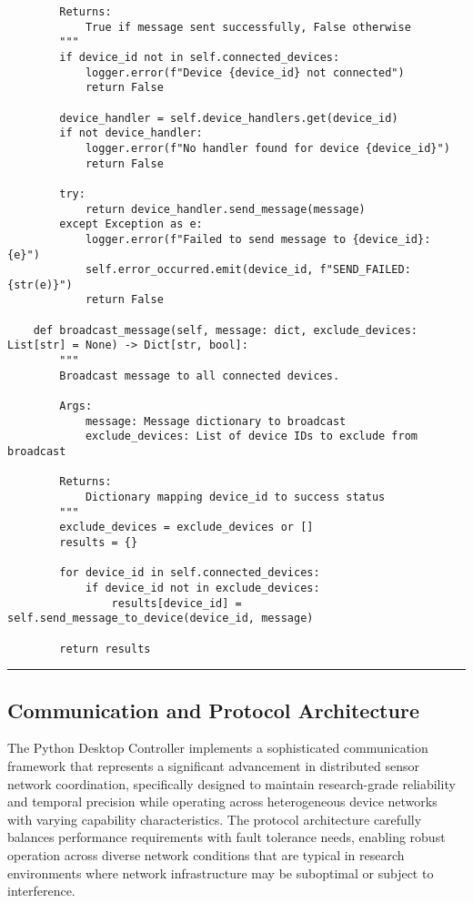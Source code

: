 \documentclass[12pt,a4paper]{article}
\begin{document}
\begin{verbatim}
        Returns:
            True if message sent successfully, False otherwise
        """
        if device_id not in self.connected_devices:
            logger.error(f"Device {device_id} not connected")
            return False

        device_handler = self.device_handlers.get(device_id)
        if not device_handler:
            logger.error(f"No handler found for device {device_id}")
            return False

        try:
            return device_handler.send_message(message)
        except Exception as e:
            logger.error(f"Failed to send message to {device_id}: {e}")
            self.error_occurred.emit(device_id, f"SEND_FAILED: {str(e)}")
            return False

    def broadcast_message(self, message: dict, exclude_devices: List[str] = None) -> Dict[str, bool]:
        """
        Broadcast message to all connected devices.
        
        Args:
            message: Message dictionary to broadcast
            exclude_devices: List of device IDs to exclude from broadcast
            
        Returns:
            Dictionary mapping device_id to success status
        """
        exclude_devices = exclude_devices or []
        results = {}

        for device_id in self.connected_devices:
            if device_id not in exclude_devices:
                results[device_id] = self.send_message_to_device(device_id, message)

        return results
\end{verbatim}

\hrule

\subsection{Communication and Protocol Architecture}

The Python Desktop Controller implements a sophisticated communication framework that represents a significant
advancement in distributed sensor network coordination, specifically designed to maintain research-grade reliability and
temporal precision while operating across heterogeneous device networks with varying capability characteristics. The
protocol architecture carefully balances performance requirements with fault tolerance needs, enabling robust operation
across diverse network conditions that are typical in research environments where network infrastructure may be
suboptimal or subject to interference.
\end{document}
